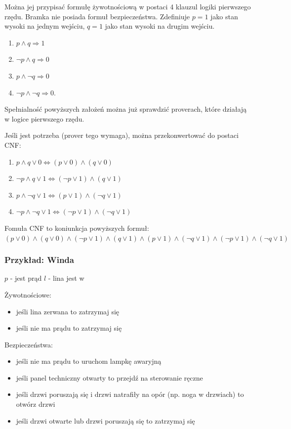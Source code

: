 \documentclass[a4paper,12pt]{article}
\begin{document}
Można jej przypisać formułę żywotnościową w postaci 4 klauzul logiki pierwszego rzędu. Bramka nie posiada formuł bezpieczeństwa. Zdefiniuje $p = 1$ jako stan wysoki na jednym wejściu, $q = 1$ jako stan wysoki na drugim wejściu.

\begin{enumerate}
  \item $p \land q \Rightarrow 1$
  \item $\lnot p \land q \Rightarrow 0$
  \item $p \land \lnot q \Rightarrow 0$
  \item $\lnot p \land \lnot q \Rightarrow 0$.
\end{enumerate}

\noindent
Spełnialność powyższych założeń można już sprawdzić proverach, które działają w logice pierwszego rzędu.

Jeśli jest potrzeba (\gls{prover} tego wymaga), można przekonwertować do postaci \gls{CNF}:

\begin{enumerate}
  \item $p \land q \lor 0 \Leftrightarrow (p \lor 0) \land (q \lor 0)$
  \item $\lnot p \land q \lor 1 \Leftrightarrow (\lnot p \lor 1) \land (q \lor 1) $
  \item $p \land \lnot q \lor 1 \Leftrightarrow (p \lor 1) \land (\lnot q \lor 1)$
  \item $\lnot p \land \lnot q \lor 1 \Leftrightarrow (\lnot p \lor 1) \land (\lnot q \lor 1)$
\end{enumerate}

\noindent
Fomuła \gls{CNF} to koniunkcja powyższych formuł: $
(p \lor 0) \land (q \lor 0) \land
(\lnot p \lor 1) \land (q \lor 1) \land
(p \lor 1) \land (\lnot q \lor 1) \land
(\lnot p \lor 1) \land (\lnot q \lor 1)
$

\subsubsection{Przykład: Winda}

$p$ - jest prąd
$l$ - lina jest w

Żywotnościowe:
\begin{itemize}
  \item jeśli lina zerwana to zatrzymaj się
  \item jeśli nie ma prądu to zatrzymaj się
\end{itemize}

Bezpieczeństwa:
\begin{itemize}
  \item jeśli nie ma prądu to uruchom lampkę awaryjną
  \item jeśli panel techniczny otwarty to przejdź na sterowanie ręczne
  \item jeśli drzwi poruszają się i drzwi natrafiły na opór (np. noga w drzwiach) to otwórz drzwi
  \item jeśli drzwi otwarte lub drzwi poruszają się to zatrzymaj się
\end{itemize}
\end{document}
